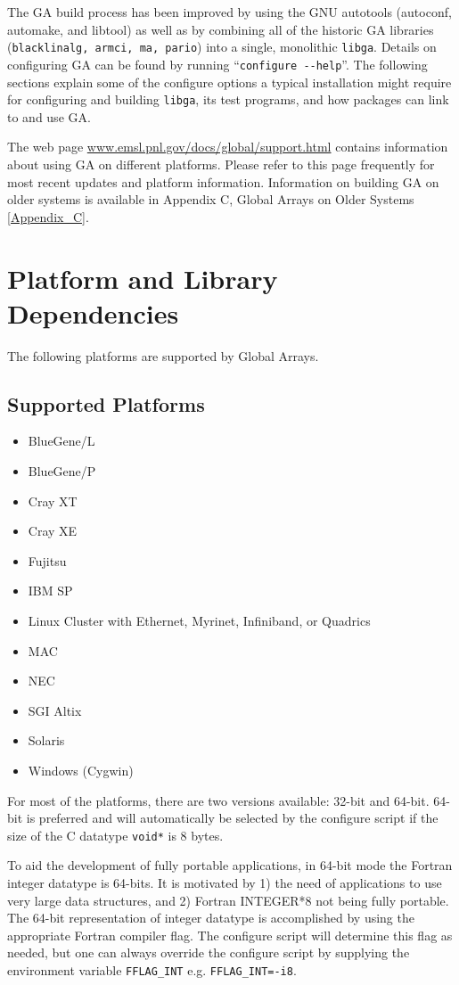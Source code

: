 The GA build process has been improved by using the GNU autotools (autoconf,
automake, and libtool) as well as by combining all of the historic GA libraries
(\texttt{blacklinalg, armci, ma, pario}) into a single, monolithic
\texttt{libga}.  Details on configuring GA can be found by running
``\texttt{configure -{}-help}''. The following sections explain some of the
configure options a typical installation might require for configuring and
building \texttt{libga}, its test programs, and how packages can link to and
use GA. 

The web page \url{www.emsl.pnl.gov/docs/global/support.html} contains
information about using GA on different platforms. Please refer to this page
frequently for most recent updates and platform information.  Information on
building GA on older systems is available in Appendix C, Global Arrays on Older
Systems \ref{Appendix_C}.

\section{Platform and Library Dependencies}

The following platforms are supported by Global Arrays. 

\subsection{Supported Platforms}
\begin{itemize}
\item BlueGene/L 
\item BlueGene/P 
\item Cray XT 
\item Cray XE 
\item Fujitsu 
\item IBM SP
\item Linux Cluster with Ethernet, Myrinet, Infiniband, or Quadrics
\item MAC
\item NEC 
\item SGI Altix
\item Solaris
\item Windows (Cygwin) 
\end{itemize}
For most of the platforms, there are two versions available: 32-bit and 64-bit.
64-bit is preferred and will automatically be selected by the configure script
if the size of the C datatype \texttt{void{*}} is 8 bytes. 

To aid the development of fully portable applications, in 64-bit mode the
Fortran integer datatype is 64-bits. It is motivated by 1) the need of
applications to use very large data structures, and 2) Fortran INTEGER{*}8 not
being fully portable. The 64-bit representation of integer datatype is
accomplished by using the appropriate Fortran compiler flag. The configure
script will determine this flag as needed, but one can always override the
configure script by supplying the environment variable \texttt{FFLAG\_INT} e.g.
\texttt{FFLAG\_INT=-i8}. 

